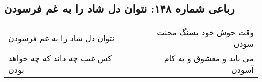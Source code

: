 \begin{center}
\section*{رباعی شماره ۱۴۸: نتوان دل شاد را به غم فرسودن}
\label{sec:sh148}
\begin{longtable}{l p{0.5cm} r}
نتوان دل شاد را به غم فرسودن
&&
وقت خوش خود بسنگ محنت سودن
\\
کس غیب چه داند که چه خواهد بودن
&&
می باید و معشوق و به کام آسودن
\\
\end{longtable}
\end{center}

